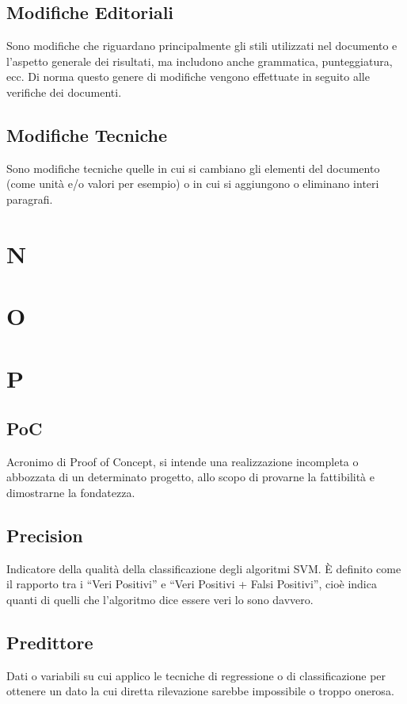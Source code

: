 \subsection*{Modifiche Editoriali}
Sono modifiche che riguardano principalmente gli stili utilizzati nel documento e l'aspetto generale dei risultati, ma includono anche grammatica, punteggiatura, ecc. Di norma questo genere di modifiche vengono effettuate in seguito alle verifiche dei documenti.

\subsection*{Modifiche Tecniche}
Sono modifiche tecniche quelle in cui si cambiano gli elementi del documento (come unità e/o valori per esempio) o in cui si aggiungono o eliminano interi paragrafi.

\clearpage
\section*{N}

\clearpage
\section*{O}

\clearpage
\section*{P}

\subsection*{PoC}
Acronimo di Proof of Concept, si intende una realizzazione incompleta o abbozzata di un determinato progetto, allo scopo di provarne la fattibilità e dimostrarne la fondatezza.

\subsection*{Precision}
Indicatore della qualità della classificazione degli algoritmi SVM\glo. È definito come il rapporto tra i “Veri Positivi” e “Veri Positivi + Falsi Positivi”, cioè indica quanti di quelli che l'algoritmo dice essere veri lo sono davvero.

\subsection*{Predittore}
Dati o variabili su cui applico le tecniche di regressione o di classificazione per ottenere un dato la cui diretta rilevazione sarebbe impossibile o troppo onerosa.

